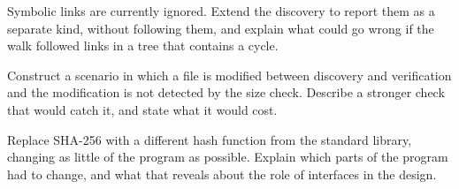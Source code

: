 \begin{exercise}
Symbolic links are currently ignored. Extend the discovery to report them as a separate kind, without following them, and explain what could go wrong if the walk followed links in a tree that contains a cycle.
\end{exercise}

\begin{exercise}
Construct a scenario in which a file is modified between discovery and verification and the modification is not detected by the size check. Describe a stronger check that would catch it, and state what it would cost.
\end{exercise}

\begin{exercise}
Replace SHA-256 with a different hash function from the standard library, changing as little of the program as possible. Explain which parts of the program had to change, and what that reveals about the role of interfaces in the design.
\end{exercise}
